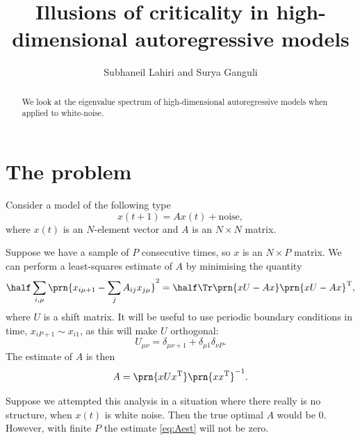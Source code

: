 \documentclass[12pt]{article}
\title{Illusions of criticality in high-dimensional autoregressive models}
\author{Subhaneil Lahiri and Surya Ganguli
%
}
\newcommand{\inv}{^{-1}}
\newcommand{\trans}{^\mathrm{T}}
\begin{document}
\maketitle




\begin{abstract}
  We look at the eigenvalue spectrum of high-dimensional autoregressive models when applied to white-noise.
\end{abstract}

\tableofcontents


\section{The problem}\label{sec:theprob}

Consider a model of the following type
%
\begin{equation}\label{eq:model}
  x(t+1) = A x(t) + \text{noise},
\end{equation}
%
where $x(t)$ is an $N$-element vector and $A$ is an $N\times N$ matrix.

Suppose we have a sample of $P$ consecutive times, so $x$ is an $N\times P$ matrix.
We can perform a least-squares estimate of $A$ by minimising the quantity
%
\begin{equation}\label{eq:minL}
  \half\sum_{i,\mu} \prn{ x_{i\mu+1} - \sum_j A_{ij} x_{j\mu} }^2 = \half\Tr \prn{xU-Ax}\prn{xU-Ax}\trans,
\end{equation}
%
where $U$ is a shift matrix.
It will be useful to use periodic boundary conditions in time, \ie $x_{iP+1}\sim x_{i1}$,
as this will make $U$ orthogonal:
%
\begin{equation}\label{eq:Udef}
  U_{\mu\nu} = \delta_{\mu\nu+1} + \delta_{\mu1}\delta_{\nu P}.
\end{equation}
%
The estimate of $A$ is then
%
\begin{equation}\label{eq:Aest}
  A = \prn{xUx\trans}\prn{xx\trans}\inv.
\end{equation}
%

Suppose we attempted this analysis in a situation where there really is no structure,
\ie when $x(t)$ is white noise.
Then the true optimal $A$ would be 0.
However, with finite $P$ the estimate \eqref{eq:Aest} will not be zero.
\end{document}

